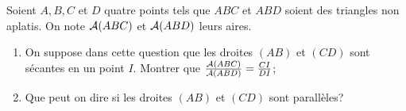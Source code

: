 \begin{exercice}
    Soient \(A, B, C\) et \(D\) quatre points tels que \(ABC\) et \(ABD\) soient 
    des triangles non aplatis. On note \(\mathcal{A}(ABC)\) et \(\mathcal{A}(ABD)\) leurs aires.
    \begin{enumerate}
        \item On suppose dans cette question que les droites \((AB)\) et 
            \((CD)\) sont sécantes en un point \(I\). Montrer que 
            \(\frac{\mathcal{A}(ABC)}{\mathcal{A}(ABD)} = \frac{CI}{DI}\);
        \item Que peut on dire si les droites \((AB)\) et \((CD)\) sont 
            parallèles?
    \end{enumerate}
\end{exercice}
